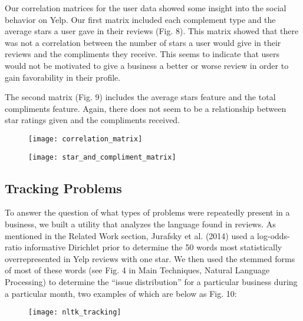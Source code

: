 \quad Our correlation matrices for the user data showed some insight into the social behavior on Yelp. Our first matrix included each complement type and the average stars a user gave in their reviews (Fig. 8). This matrix showed that there was not a correlation between the number of stars a user would give in their reviews and the compliments they receive. This seems to indicate that users would not be motivated to give a business a better or worse review in order to gain favorability in their profile.

\quad The second matrix (Fig. 9) includes the average stars feature and the total compliments feature. Again, there does not seem to be a relationship between star ratings given and the compliments received.

\begin{figure}[h]
\texttt{[image: correlation\_matrix]}
\end{figure}

\begin{figure}[h]
\texttt{[image: star\_and\_compliment\_matrix]}
\end{figure}

\subsection{Tracking Problems}

\quad To answer the question of what types of problems were repeatedly present in a business, we built a utility that analyzes the language found in reviews. As mentioned in the Related Work section, Jurafsky et al. (2014) used a log-odds-ratio informative Dirichlet prior to determine the 50 words most statistically overrepresented in Yelp reviews with one star. We then used the stemmed forms of most of these words (see Fig. 4 in Main Techniques, Natural Language Processing) to determine the “issue distribution” for a particular business during a particular month, two examples of which are below as Fig. 10:

\begin{figure}[h]
\texttt{[image: nltk\_tracking]}
\end{figure}

